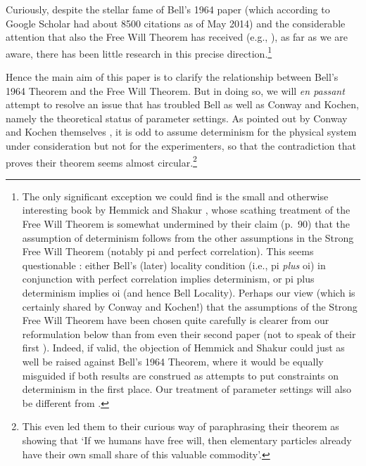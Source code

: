 \documentclass[12pt]{article}
\begin{document}
Curiously, despite the stellar fame of Bell's 1964 paper (which according to Google Scholar had about 8500 citations as of May 2014) and the considerable attention that also the Free Will Theorem has received (e.g., \cite{GT,GtH}), as far as we are aware, there has been little research in this precise direction.\footnote{The only significant exception we could find is the small and otherwise interesting book by Hemmick and Shakur \cite{HS}, whose scathing  treatment of the  Free Will Theorem  is somewhat undermined by their claim (p.\ 90) that the assumption of determinism follows from the other assumptions in the Strong Free Will Theorem (notably {\sc pi} and perfect correlation). This seems questionable \cite{Wiseman}: 
either Bell's (later) locality condition  (i.e., {\sc pi} \emph{plus} {\sc oi})  in conjunction with perfect correlation  implies determinism,
or   {\sc pi} plus  determinism  implies {\sc oi} (and hence Bell Locality). Perhaps our view (which is certainly shared by Conway and Kochen!) that the assumptions of the Strong Free Will Theorem have been chosen quite carefully is clearer from our reformulation below than from even their second paper \cite{CK2} (not to speak of  their first \cite{CK1}). Indeed, if valid, the objection of  Hemmick and Shakur could just as well be raised against Bell's 1964 Theorem, where it would be equally misguided if both results are construed as attempts to put constraints on determinism in the first place. Our treatment of parameter settings will also be different from \cite{HS}.} 

Hence the main aim of this paper is to clarify the relationship between Bell's 1964 Theorem and the Free Will Theorem. But in doing so, we will \emph{en passant} attempt to resolve an issue that has troubled Bell as well as Conway and Kochen, namely the theoretical status of parameter settings.
As pointed out by Conway and Kochen themselves \cite{CK2}, it is odd to assume determinism for the physical system under consideration but not for the experimenters, so that the contradiction that proves their theorem seems almost circular.\footnote{This even led them to their curious way of paraphrasing their theorem as showing that 
`If we humans have free will, then elementary particles already
have their own small share of this valuable commodity'.}
\end{document}
